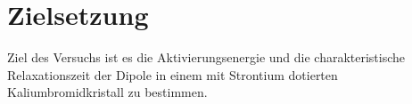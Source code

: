 
\section{Zielsetzung}
\label{sec:Zielsetzung}

Ziel des Versuchs ist es die Aktivierungsenergie und die charakteristische Relaxationszeit der Dipole in einem mit Strontium dotierten Kaliumbromidkristall zu bestimmen.
